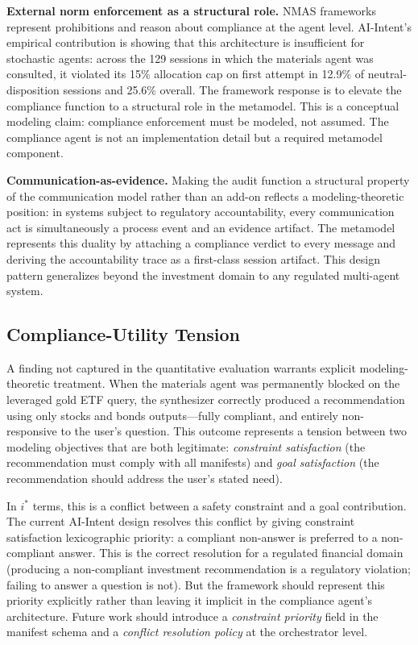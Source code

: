 \documentclass[runningheads]{llncs}
\begin{document}
\textbf{External norm enforcement as a structural role.} NMAS frameworks
represent prohibitions and reason about compliance at the agent level.
AI-Intent's empirical contribution is showing that this architecture is
insufficient for stochastic agents: across the 129 sessions in which the
materials agent was consulted, it violated its 15\% allocation cap on
first attempt in 12.9\% of neutral-disposition sessions and 25.6\%
overall.
The framework response is to elevate the compliance function to a
structural role in the metamodel. This is a conceptual modeling claim:
compliance enforcement must be modeled, not assumed. The compliance agent
is not an implementation detail but a required metamodel component.

\textbf{Communication-as-evidence.} Making the audit function a
structural property of the communication model rather than an add-on
reflects a modeling-theoretic position: in systems subject to regulatory
accountability, every communication act is simultaneously a process event
and an evidence artifact. The metamodel represents this duality by
attaching a compliance verdict to every message and deriving the
accountability trace as a first-class session artifact. This design
pattern generalizes beyond the investment domain to any regulated
multi-agent system.

\subsection{Compliance-Utility Tension}

A finding not captured in the quantitative evaluation warrants explicit
modeling-theoretic treatment. When the materials agent was permanently
blocked on the leveraged gold ETF query, the synthesizer correctly
produced a recommendation using only stocks and bonds outputs---fully
compliant, and entirely non-responsive to the user's question. This
outcome represents a tension between two modeling objectives that are
both legitimate: \emph{constraint satisfaction} (the recommendation must
comply with all manifests) and \emph{goal satisfaction} (the
recommendation should address the user's stated need).

In $i^*$ terms, this is a conflict between a safety constraint and a
goal contribution. The current AI-Intent design resolves this conflict by
giving constraint satisfaction lexicographic priority: a compliant
non-answer is preferred to a non-compliant answer. This is the correct
resolution for a regulated financial domain (producing a non-compliant
investment recommendation is a regulatory violation; failing to answer a
question is not). But the framework should represent this priority
explicitly rather than leaving it implicit in the compliance agent's
architecture. Future work should introduce a \emph{constraint priority}
field in the manifest schema and a \emph{conflict resolution policy} at
the orchestrator level.
\end{document}

